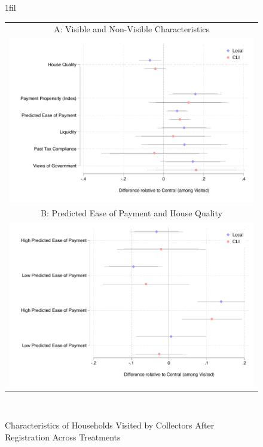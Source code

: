 \documentclass[12pt,english]{article}
\makeatletter
\newcommand*{\centerfloat}{%
  \parindent \z@
  \leftskip \z@ \@plus 1fil \@minus \textwidth
  \rightskip\leftskip
  \parfillskip \z@skip}
\makeatother
\begin{document}
\begin{figure}[H]
\centering{}\caption{Characteristics of Households Visited by Collectors After Registration Across Treatments
\label{fig:main_targeting1}}
\centering
\centerfloat
\begin{tabular}{c}
A: Visible and Non-Visible Characteristics\\
\includegraphics[scale=.62]{Output/chars_visited.pdf}\\
B: Predicted Ease of Payment and House Quality\\
\includegraphics[scale=.8]{Output/chars_PEXHQ.pdf}\\
\end{tabular}
\usebox{\tablebox}\\[1ex]

\end{figure}
\end{document}
